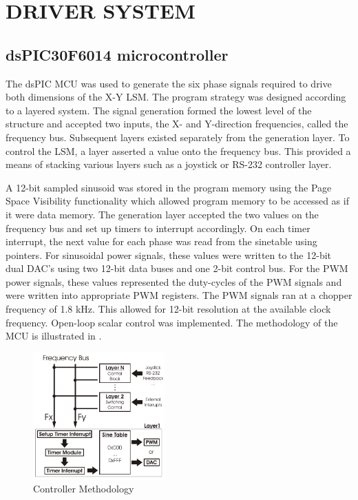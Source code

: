 \documentclass[10pt,twocolumn]{witseiepaper}
\begin{document}
\section{DRIVER SYSTEM}
\subsection{dsPIC30F6014 microcontroller}
The dsPIC MCU was used to generate the six phase signals required to drive
both dimensions of the X-Y LSM.  The program strategy was designed according
to a layered system.  The signal generation formed the lowest level of the
structure and accepted two inputs, the X- and Y-direction frequencies, called
the frequency bus.  Subsequent layers existed separately from the generation
layer.  To control the LSM, a layer asserted a value onto the frequency bus.
This provided a means of stacking various layers such as a joystick or RS-232
controller layer.  

A 12-bit sampled sinusoid was stored in the program memory using the Page
Space Visibility functionality which allowed program memory to be accessed as
if it were data memory.  The generation layer accepted the two values on the
frequency bus and set up timers to interrupt accordingly.  On each timer
interrupt, the next value for each phase was read from the sinetable using
pointers.  For sinusoidal power signals, these values were written to the
12-bit dual DAC's using two 12-bit data buses and one 2-bit control bus.  For
the PWM power signals, these values represented the duty-cycles of the PWM
signals and were written into appropriate PWM registers.  The PWM signals ran
at a chopper frequency of 1.8 kHz.  This allowed for 12-bit resolution at the
available clock frequency.  Open-loop scalar control was implemented.  The
methodology of the MCU is illustrated in .
\begin{figure}[hb]
	\centering
		\includegraphics[width=0.45\textwidth]{../../Drawings/Controller.pdf}
	\caption{Controller Methodology}
	\label{fig:Controller}
\end{figure}
\end{document}
